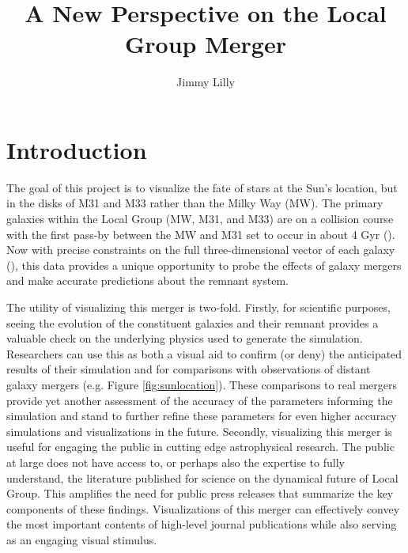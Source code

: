 \documentclass{aastex63}
\begin{document}
\title{A New Perspective on the Local Group Merger}

\author{Jimmy Lilly}


\section{Introduction} \label{sec:intro}
The goal of this project is to visualize the fate of stars at the Sun's location, but in the disks of M31 and M33 rather than the Milky Way (MW). The primary galaxies within the Local Group (MW, M31, and M33) are on a collision course with the first pass-by between the MW and M31 set to occur in about 4 Gyr (\cite{2012ApJ...753....9V}). Now with precise constraints on the full three-dimensional vector of each galaxy (\cite{2012ApJ...753....8V}), this data provides a unique opportunity to probe the effects of galaxy mergers and make accurate predictions about the remnant system.

The utility of visualizing this merger is two-fold. Firstly, for scientific purposes, seeing the evolution of the constituent galaxies and their remnant provides a valuable check on the underlying physics used to generate the simulation. Researchers can use this as both a visual aid to confirm (or deny) the anticipated results of their simulation and for comparisons with observations of distant galaxy mergers (e.g. Figure \ref{fig:sunlocation}). These comparisons to real mergers provide yet another assessment of the accuracy of the parameters informing the simulation and stand to further refine these parameters for even higher accuracy simulations and visualizations in the future. Secondly, visualizing this merger is useful for engaging the public in cutting edge astrophysical research. The public at large does not have access to, or perhaps also the expertise to fully understand, the literature published for science on the dynamical future of Local Group. This amplifies the need for public press releases that summarize the key components of these findings. Visualizations of this merger can effectively convey the most important contents of high-level journal publications while also serving as an engaging visual stimulus.
\end{document}
